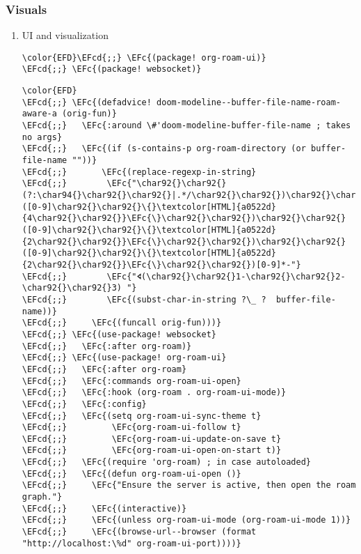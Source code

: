 \documentclass[12pt]{article}
\theoremstyle{plain}%
\theoremstyle{definition}
\theoremstyle{remark}
\newcommand{\EFc}[1]{\textcolor{EFc}{#1}} %
\newcommand{\EFcd}[1]{\textcolor{EFcd}{#1}} %
\begin{document}
\subsubsection{Visuals}
\label{sec:org1835bf5}
\begin{enumerate}
\item UI and visualization
\label{sec:orgcb6273f}
\begin{Code}
\begin{Verbatim}
\color{EFD}\EFcd{;;} \EFc{(package! org-roam-ui)}
\EFcd{;;} \EFc{(package! websocket)}
\end{Verbatim}
\end{Code}
\begin{Code}
\begin{Verbatim}
\color{EFD}
\EFcd{;;} \EFc{(defadvice! doom-modeline--buffer-file-name-roam-aware-a (orig-fun)}
\EFcd{;;}   \EFc{:around \#'doom-modeline-buffer-file-name ; takes no args}
\EFcd{;;}   \EFc{(if (s-contains-p org-roam-directory (or buffer-file-name ""))}
\EFcd{;;}       \EFc{(replace-regexp-in-string}
\EFcd{;;}        \EFc{"\char92{}\char92{}(?:\char94{}\char92{}\char92{}|.*/\char92{}\char92{})\char92{}\char92{}([0-9]\char92{}\char92{}\{}\textcolor[HTML]{a0522d}{4\char92{}\char92{}}\EFc{\}\char92{}\char92{})\char92{}\char92{}([0-9]\char92{}\char92{}\{}\textcolor[HTML]{a0522d}{2\char92{}\char92{}}\EFc{\}\char92{}\char92{})\char92{}\char92{}([0-9]\char92{}\char92{}\{}\textcolor[HTML]{a0522d}{2\char92{}\char92{}}\EFc{\}\char92{}\char92{})[0-9]*-"}
\EFcd{;;}        \EFc{"🢔(\char92{}\char92{}1-\char92{}\char92{}2-\char92{}\char92{}3) "}
\EFcd{;;}        \EFc{(subst-char-in-string ?\_ ?  buffer-file-name))}
\EFcd{;;}     \EFc{(funcall orig-fun)))}
\EFcd{;;} \EFc{(use-package! websocket}
\EFcd{;;}   \EFc{:after org-roam)}
\EFcd{;;} \EFc{(use-package! org-roam-ui}
\EFcd{;;}   \EFc{:after org-roam}
\EFcd{;;}   \EFc{:commands org-roam-ui-open}
\EFcd{;;}   \EFc{:hook (org-roam . org-roam-ui-mode)}
\EFcd{;;}   \EFc{:config}
\EFcd{;;}   \EFc{(setq org-roam-ui-sync-theme t}
\EFcd{;;}         \EFc{org-roam-ui-follow t}
\EFcd{;;}         \EFc{org-roam-ui-update-on-save t}
\EFcd{;;}         \EFc{org-roam-ui-open-on-start t)}
\EFcd{;;}   \EFc{(require 'org-roam) ; in case autoloaded}
\EFcd{;;}   \EFc{(defun org-roam-ui-open ()}
\EFcd{;;}     \EFc{"Ensure the server is active, then open the roam graph."}
\EFcd{;;}     \EFc{(interactive)}
\EFcd{;;}     \EFc{(unless org-roam-ui-mode (org-roam-ui-mode 1))}
\EFcd{;;}     \EFc{(browse-url--browser (format "http://localhost:\%d" org-roam-ui-port))))}
\end{Verbatim}
\end{Code}
\end{enumerate}
\end{document}
